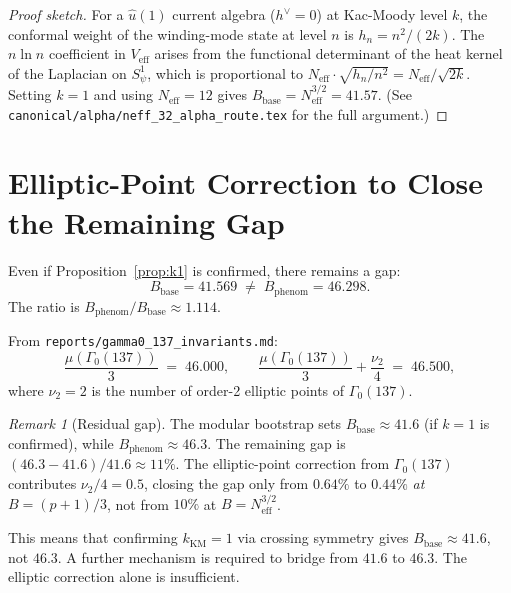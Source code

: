 \documentclass[12pt,a4paper]{article}
\theoremstyle{definition}
\theoremstyle{remark}
\newtheorem{remark}[theorem]{Remark}
\begin{document}
\begin{proof}[Proof sketch]
For a $\hat{u}(1)$ current algebra ($h^\vee = 0$) at Kac-Moody level $k$,
the conformal weight of the winding-mode state at level $n$ is
$h_n = n^2/(2k)$.  The $n\ln n$ coefficient in $V_{\mathrm{eff}}$ arises
from the functional determinant of the heat kernel of the Laplacian on
$S^1_\psi$, which is proportional to $N_{\mathrm{eff}} \cdot \sqrt{h_n/n^2}
= N_{\mathrm{eff}}/\sqrt{2k}$.
Setting $k = 1$ and using $N_{\mathrm{eff}} = 12$ gives
$B_{\mathrm{base}} = N_{\mathrm{eff}}^{3/2} = 41.57$.
(See \texttt{canonical/alpha/neff\_32\_alpha\_route.tex} for the full argument.)
\end{proof}

\section{Elliptic-Point Correction to Close the Remaining Gap}
\label{sec:elliptic}

Even if Proposition~\ref{prop:k1} is confirmed, there remains a gap:
\[
  B_{\mathrm{base}} = 41.569 \;\neq\; B_{\mathrm{phenom}} = 46.298.
\]
The ratio is $B_{\mathrm{phenom}}/B_{\mathrm{base}} \approx 1.114$.

From \texttt{reports/gamma0\_137\_invariants.md}:
\[
  \frac{\mu(\Gamma_0(137))}{3} \;=\; 46.000,
  \qquad
  \frac{\mu(\Gamma_0(137))}{3} + \frac{\nu_2}{4} \;=\; 46.500,
\]
where $\nu_2 = 2$ is the number of order-2 elliptic points of $\Gamma_0(137)$.

\begin{remark}[Residual gap]
The modular bootstrap sets $B_{\mathrm{base}} \approx 41.6$ (if $k=1$ is
confirmed), while $B_{\mathrm{phenom}} \approx 46.3$.  The remaining gap is
$(46.3 - 41.6)/41.6 \approx 11\%$.  The elliptic-point correction from
$\Gamma_0(137)$ contributes $\nu_2/4 = 0.5$, closing the gap only from $0.64\%$
to $0.44\%$ \emph{at} $B = (p+1)/3$, not from $10\%$ at $B = N_{\mathrm{eff}}^{3/2}$.

This means that confirming $k_{\mathrm{KM}} = 1$ via crossing symmetry gives
$B_{\mathrm{base}} \approx 41.6$, not $46.3$.  A further mechanism is required
to bridge from $41.6$ to $46.3$.  The elliptic correction alone is insufficient.
\end{remark}

\end{document}

